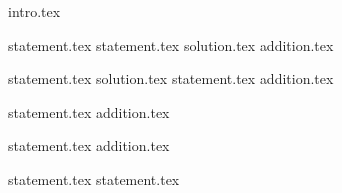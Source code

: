 {intro.tex}

{statement.tex}
{statement.tex}
{solution.tex}
{addition.tex}

{statement.tex}
{solution.tex}
{statement.tex}
{addition.tex}

{statement.tex}
{addition.tex}

{statement.tex}
{addition.tex}

{statement.tex}
{statement.tex}